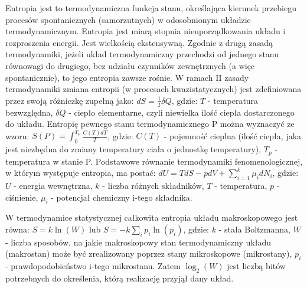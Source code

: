 Entropia jest to termodynamiczna funkcja stanu, określająca kierunek przebiegu procesów spontanicznych (samorzutnych) w odosobnionym układzie termodynamicznym. Entropia jest miarą stopnia nieuporządkowania układu i rozproszenia energii. Jest wielkością ekstensywną. Zgodnie z drugą zasadą termodynamiki, jeżeli układ termodynamiczny przechodzi od jednego stanu równowagi do drugiego, bez udziału czynników zewnętrznych (a więc spontanicznie), to jego entropia zawsze rośnie. W ramach II zasady termodynamiki zmiana entropii (w procesach kwazistatycznych) jest zdefiniowana przez swoją różniczkę zupełną jako:\newline
$ dS = \frac{1}{T}\delta Q $, gdzie:\newline
$ T $ - temperatura bezwzględna,\newline
$ \delta Q $ - ciepło elementarne, czyli niewielka ilość ciepła dostarczonego do układu.\newline
Entropię pewnego stanu termodynamicznego P można wyznaczyć ze wzoru:\newline
$ S(P) = \int_{0}^{T_p}\frac{C(T)dT}{T} $, gdzie:\newline
$ C(T) $ - pojemność cieplna (ilość ciepła, jaka jest niezbędna do zmiany temperatury ciała o jednostkę temperatury),\newline
$ T_p $ - temperatura w stanie P.
Podstawowe równanie termodynamiki fenomenologicznej, w którym występuje entropia, ma postać:\newline
$ dU = TdS - pdV + \sum_{i=1}^{k}\mu_idN_i $, gdzie:\newline
$ U $ - energia wewnętrzna,\newline
$ k $ - liczba różnych składników,\newline
$ T $ - temperatura,\newline
$ p $ - ciśnienie,\newline
$ \mu_i $ - potencjał chemiczny i-tego składnika.

W termodynamice statystycznej całkowita entropia układu makroskopowego jest równa:\newline
$ S = k\ln(W) $\newline
lub\newline
$ S = -k\sum_{i}p_i\ln(p_i) $, gdzie:\newline
$ k $ - stała Boltzmanna,\newline
$ W $ - liczba sposobów, na jakie makroskopowy stan termodynamiczny układu (makrostan) może być zrealizowany poprzez stany mikroskopowe (mikrostany),\newline
$ p_i $ - prawdopodobieństwo i-tego mikrostanu.\newline
Zatem $ \log_2(W) $ jest liczbą bitów potrzebnych do określenia, którą realizację przyjął dany układ.

